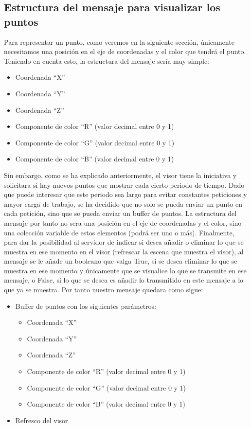 \subsection{Estructura del mensaje para visualizar los puntos}
Para representar un punto, como veremos en la siguiente sección, únicamente necesitamos una posición en el eje de coordenadas y el color que tendrá el punto. Teniendo en cuenta esto, la estructura del mensaje sería muy simple:
\begin{itemize}
\item Coordenada ``X''
\item Coordenada ``Y''
\item Coordenada ``Z''
\item Componente de color ``R'' (valor decimal entre 0 y 1)
\item Componente de color ``G'' (valor decimal entre 0 y 1)
\item Componente de color ``B'' (valor decimal entre 0 y 1)
\end{itemize}
Sin embargo, como se ha explicado anteriormente, el visor tiene la iniciativa y solicitara si hay nuevos puntos que mostrar cada cierto periodo de tiempo. Dado que puede interesar que este periodo sea largo para evitar constantes peticiones y mayor carga de trabajo, se ha decidido que no solo se pueda enviar un punto en cada petición, sino que se pueda enviar un buffer de puntos. La estructura del mensaje por tanto no sera una posición en el eje de coordenadas y el color, sino una colección variable de estos elementos (podrá ser uno o más).
Finalmente, para dar la posibilidad al servidor de indicar si desea añadir o eliminar lo que se muestra en ese momento en el visor (refrescar la escena que muestra el visor), al mensaje se le añade un booleano que valga True, si se desea eliminar lo que se muestra en ese momento y únicamente que se visualice lo que se transmite en ese mensaje, o False, si lo que se desea es añadir lo transmitido en este mensaje a lo que ya se muestra.
Por tanto nuestro mensaje quedara como sigue:
\begin{itemize}
\item Buffer de puntos con los siguientes parámetros:
	\begin{itemize}
	\item Coordenada ``X''
	\item Coordenada ``Y''
	\item Coordenada ``Z''
	\item Componente de color ``R'' (valor decimal entre 0 y 1)
	\item Componente de color ``G'' (valor decimal entre 0 y 1)
	\item Componente de color ``B'' (valor decimal entre 0 y 1)
	\end{itemize}
\item Refresco del visor
\end{itemize}

